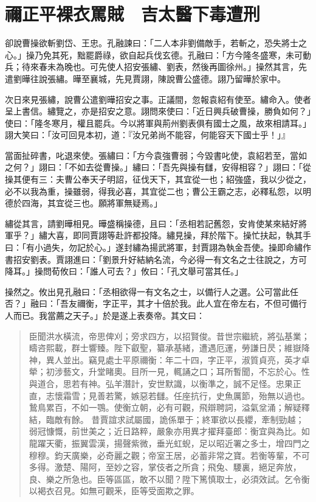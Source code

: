 
\chapter{禰正平裸衣罵賊　吉太醫下毒遭刑}

卻說曹操欲斬劉岱、王忠。孔融諫曰：「二人本非劉備敵手，若斬之，恐失將士之心。」操乃免其死，黜罷爵祿，欲自起兵伐玄德。孔融曰：「方今隆冬盛寒，未可動兵；待來春未為晚也。可先使人招安張繡、劉表，然後再圖徐州。」操然其言，先遣劉曄往說張繡。曄至襄城，先見賈詡，陳說曹公盛德。詡乃留曄於家中。

次日來見張繡，說曹公遣劉曄招安之事。正議間，忽報袁紹有使至。繡命入。使者呈上書信。繡覽之，亦是招安之意。詡問來使曰：「近日興兵破曹操，勝負如何？」使曰：「隆冬寒月，權且罷兵。今以將軍與荊州劉表俱有國士之風，故來相請耳。」詡大笑曰：「汝可回見本初，道：『汝兄弟尚不能容，何能容天下國士乎！」』

當面扯碎書，叱退來使。張繡曰：「方今袁強曹弱；今毀書叱使，袁紹若至，當如之何？」詡曰：「不如去從曹操。」繡曰：「吾先與操有讎，安得相容？」詡曰：「從操其便有三：夫曹公奉天子明詔，征伐天下，其宜從一也；紹強盛，我以少從之，必不以我為重，操雖弱，得我必喜，其宜從二也；曹公王霸之志，必釋私怨，以明德於四海，其宜從三也。願將軍無疑焉。」

繡從其言，請劉曄相見。曄盛稱操德，且曰：「丞相若記舊怨，安肯使某來結好將軍乎？」繡大喜，即同賈詡等赴許都投降。繡見操，拜於階下。操忙扶起，執其手曰：「有小過失，勿記於心。」遂封繡為揚武將軍，封賈詡為執金吾使。操即命繡作書招安劉表。賈詡進曰：「劉景升好結納名流，今必得一有文名之士往說之，方可降耳。」操問荀攸曰：「誰人可去？」攸曰：「孔文舉可當其任。」

操然之。攸出見孔融曰：「丞相欲得一有文名之士，以備行人之選。公可當此任否？」融曰：「吾友禰衡，字正平，其才十倍於我。此人宜在帝左右，不但可備行人而已。我當薦之天子。」於是遂上表奏帝。其文曰：

\begin{quote}
臣聞洪水橫流，帝思俾刈；旁求四方，以招賢俊。昔世宗繼統，將弘基業；疇咨熙載，群士響臻。陛下叡聖，纂承基緒，遭遇厄運，勞謙日昃；維嶽降神，異人並出。竊見處士平原禰衡：年二十四，字正平，淑質貞亮，英才卓犖；初涉藝文，升堂睹奧。目所一見，輒誦之口；耳所暫聞，不忘於心。性與道合，思若有神。弘羊潛計，安世默識，以衡準之，誠不足怪。忠果正直，志懷霜雪；見善若驚，嫉惡若讎。任座抗行，史魚厲節，殆無以過也。鷙鳥累百，不如一鶚。使衡立朝，必有可觀，飛辯聘詞，溢氣坌涌；解疑釋結，臨敵有餘。
昔賈誼求試屬國，詭係單于；終軍欲以長纓，牽制勁越；弱冠慷慨，前世美之；近日路粹，嚴象亦用異才擢拜臺郎：衡宜與為比。如龍躍天衢，振翼雲漢，揚聲紫微，垂光虹蜺，足以昭近署之多士，增四門之穆穆。鈞天廣樂，必奇麗之觀；帝室王居，必蓄非常之寶。若衡等輩，不可多得。激楚、陽阿，至妙之容，掌伎者之所貪；飛兔、騕裏，絕足奔放，良、樂之所急也。臣等區區，敢不以聞？陞下篤慎取士，必須效試。乞令衡以褐衣召見。如無可觀釆，臣等受面欺之罪。
\end{quote}

